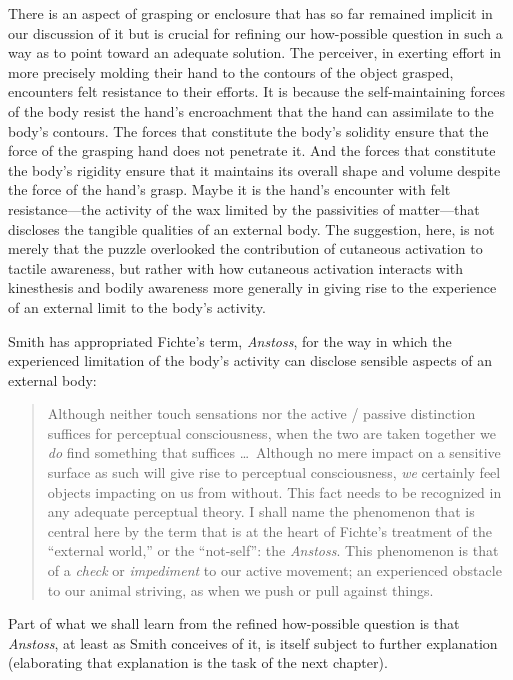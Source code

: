 There is an aspect of grasping or enclosure that has so far remained implicit in our discussion of it but is crucial for refining our how-possible question in such a way as to point toward an adequate solution. The perceiver, in exerting effort in more precisely molding their hand to the contours of the object grasped, encounters felt resistance to their efforts. It is because the self-maintaining forces of the body resist the hand's encroachment that the hand can assimilate to the body's contours. The forces that constitute the body's solidity ensure that the force of the grasping hand does not penetrate it. And the forces that constitute the body's rigidity ensure that it maintains its overall shape and volume despite the force of the hand's grasp. Maybe it is the hand's encounter with felt resistance---the activity of the wax limited by the passivities of matter---that discloses the tangible qualities of an external body. The suggestion, here, is not merely that the puzzle overlooked the contribution of cutaneous activation to tactile awareness, but rather with how cutaneous activation interacts with kinesthesis and bodily awareness more generally in giving rise to the experience of an external limit to the body's activity.

Smith has appropriated Fichte's term, \emph{Anstoss}, for the way in which the experienced limitation of the body's activity can disclose sensible aspects of an external body:
\begin{quote}
	Although neither touch sensations nor the active / passive distinction suffices for perceptual consciousness, when the two are taken together we \emph{do} find something that suffices \ldots\ Although no mere impact on a sensitive surface as such will give rise to perceptual consciousness, \emph{we} certainly feel objects impacting on us from without. This fact needs to be recognized in any adequate perceptual theory. I shall name the phenomenon that is central here by the term that is at the heart of Fichte's treatment of the ``external world,'' or the ``not-self'': the \emph{Anstoss}. This phenomenon is that of a \emph{check} or \emph{impediment} to our active movement; an experienced obstacle to our animal striving, as when we push or pull against things. \citep[153]{Smith:2002sa} 
\end{quote}
Part of what we shall learn from the refined how-possible question is that \emph{Anstoss}, at least as Smith conceives of it, is itself subject to further explanation (elaborating that explanation is the task of the next chapter). 

